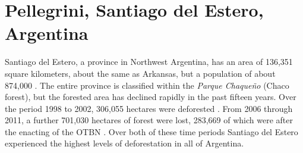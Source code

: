 \section{Pellegrini, Santiago del Estero, Argentina}

Santiago del Estero, a province in Northwest Argentina, has an area of 136,351 square kilometers, about the same as Arkansas, but a population of about 874,000 \autocite{estadistica-y-c2010a}. The entire province is classified within the \textit{Parque Chaqueño} (Chaco forest), but the forested area has declined rapidly in the past fifteen years. Over the period 1998 to 2002, 306,055 hectares were deforested \autocite{secretaria-de-a2007informe}. From 2006 through 2011, a further 701,030 hectares of forest were lost, 283,669 of which were after the enacting of the OTBN \autocite{secreteria-de-a2012monitoreo}. Over both of these time periods Santiago del Estero experienced the highest levels of deforestation in all of Argentina.

